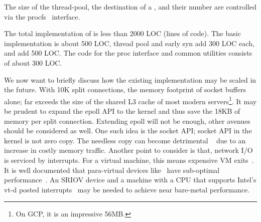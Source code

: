  The size of the thread-pool, the destination of a \reconn, and their number are controlled via the procfs~\cite{proc} interface.

 The total implementation of \ksplit is less than 2000 LOC (lines of code). The basic implementation is about 500 LOC, thread pool and early syn add 300 LOC each, and \reconn add 500 LOC. The code for the proc interface and common utilities consists of about 300 LOC.

 We now want to briefly discuss how the existing implementation may be scaled in the future. With 10K split connections, the memory footprint of socket buffers alone; far exceeds the size of the shared L3 cache of most modern servers\footnote{On GCP, it is an impressive 56MB.}. It may be prudent to expand the epoll API to the kernel and thus save the 18KB of memory per split connection. Extending epoll will not be enough, other avenues should be considered as well.
One such idea is the socket API; socket API in the kernel is not zero copy. The needless copy can become detrimental ~\cite{Copy} due to an increase in costly memory traffic. Another point to consider is that, network I/O is serviced by interrupts. For a virtual machine, this means expensive VM exits~\cite{Eli, Elvis}. It is well documented that para-virtual devices like~\cite{virtio,vmxnet3} have sub-optimal performance~\cite{Eli, Elvis}. An SRIOV device and a machine with a CPU that supports Intel's vt-d posted interrupts~\cite{posted} may be needed to achieve near bare-metal performance.